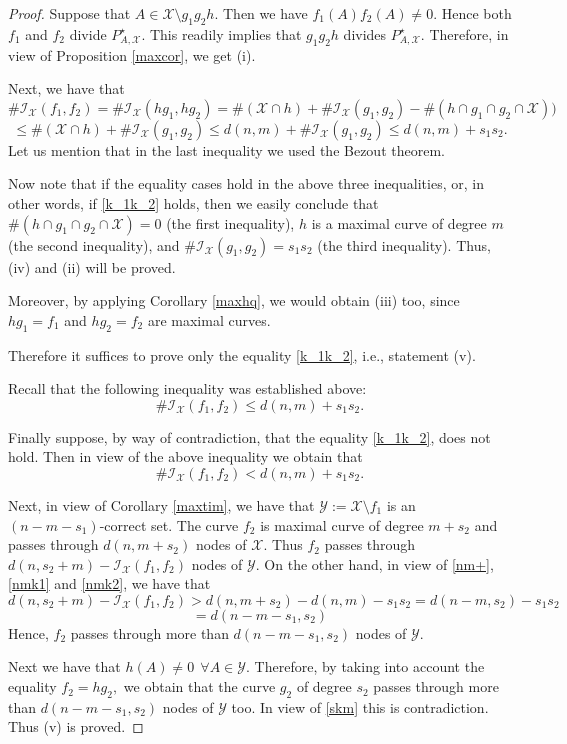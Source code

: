 \documentclass[a4paper,12pt]{article}
\theoremstyle{definition}
\numberwithin{equation}{section}
\numberwithin{figure}{section}
\newcommand{\Iset}{\mathcal{I}}
\newcommand{\Xset}{\mathcal{X}}
\newcommand{\Yset}{\mathcal{Y}}
\begin{document}
\begin{proof} Suppose that $A\in\Xset\setminus g_1g_2h.$ Then we have $f_1(A)f_2(A)\neq 0.$ Hence both $f_1$ and $f_2$ divide $P^\star_{A,\Xset}.$
This readily implies that $g_1g_2h$ divides $P^\star_{A,\Xset}.$ Therefore, in view of Proposition \ref{maxcor}, we get (i).

Next, we have that
$$\#\Iset_\Xset (f_1,f_2)=\#\Iset_\Xset (hg_1,hg_2)= \#(\Xset\cap h)+\#\Iset_{\Xset} (g_1,g_2) -\#(h\cap g_1\cap g_2\cap \Xset))$$ $$\le \#(\Xset\cap h)+\#\Iset_{\Xset}(g_1,g_2)\le d(n,m)+\#\Iset_{\Xset}(g_1,g_2)\le d(n,m)+s_1 s_2.$$
Let us mention that in the last inequality we used the Bezout theorem.

Now note that if the equality cases hold in the above three inequalities, or, in other words, if \eqref{k_1k_2} holds, then we easily conclude that $\#(h\cap g_1\cap g_2\cap \Xset)=0$ (the first inequality), $h$ is a maximal curve of degree $m$ (the second inequality), and $\#\Iset_\Xset(g_1,g_2) =s_1 s_2$ (the third inequality). Thus, (iv) and (ii) will be proved.


Moreover,  by applying Corollary \ref{maxhq}, we would obtain (iii) too, since $hg_1=f_1$ and $hg_2=f_2$ are maximal curves. 

\noindent Therefore it suffices to prove only the equality \eqref{k_1k_2}, i.e., statement (v).

Recall that the following inequality was established above:
$$\#\Iset_\Xset(f_1,f_2) \le d(n,m)+s_1 s_2.$$

Finally suppose, by way of contradiction, that the equality \eqref{k_1k_2}, does not hold. Then in view of the above inequality we obtain that
\begin{equation} \label{nm+}\#\Iset_\Xset(f_1,f_2) <d(n,m)+s_1 s_2.\end{equation}

Next, in view of Corollary  \ref{maxtim}, we have that $\Yset:=\Xset\setminus f_1$ is an $(n-m-s_1)$-correct set.
The curve $f_2$ is maximal curve of degree $m+s_2$ and passes through
$d(n,m+s_2)$ nodes of $\Xset.$ Thus $f_2$ passes through $d(n,s_2+m)-\Iset_\Xset(f_1,f_2)$ nodes of $\Yset.$ On the other hand, in view of \eqref{nm+},  \eqref{nmk1} and \eqref{nmk2}, we have that 
$$d(n,s_2+m)-\Iset_\Xset(f_1,f_2)>d(n,m+s_2)-d(n,m)-s_1 s_2=d(n-m,s_2)-s_1 s_2$$
$$=d(n-m-s_1,s_2)$$ Hence, $f_2$ passes through more than $d(n-m-s_1,s_2)$
nodes of $\Yset.$

Next we have that $h(A)\neq 0\ \ \forall A\in \Yset.$ Therefore, by taking into account the equality $f_2=h g_2,$ we obtain that the curve $g_2$ of degree $s_2$ passes through more than $d(n-m-s_1,s_2)$ nodes of $\Yset$ too. In view of \eqref{skm} this is contradiction.
Thus (v) is proved. \end{proof}
\end{document}
